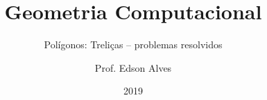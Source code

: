 \title{Geometria Computacional}
\subtitle{Polígonos: Treliças -- problemas resolvidos}
\date{2019}
\author{Prof. Edson Alves}
